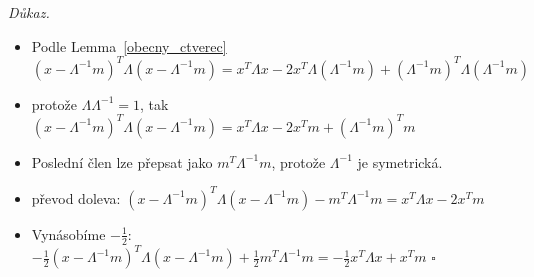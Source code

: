 \documentclass{article}
\newenvironment{pitemize}{
\begin{itemize}
  \setlength{\itemsep}{5pt}
  \setlength{\parskip}{0pt}
  \setlength{\parsep}{0pt}
}{\end{itemize}}
\newenvironment{pproof}{
\noindent\emph{Důkaz.}
\begin{pitemize}
}{\hfill$\square$\end{pitemize}}
\theoremstyle{definition}
\begin{document}
\begin{pproof}
\item Podle Lemma~\ref{obecny_ctverec} $(x-\Lambda^{-1} m)^T\Lambda(x-\Lambda^{-1} m)=x^T\Lambda x-2x^T\Lambda (\Lambda^{-1} m)+(\Lambda^{-1} m)^T\Lambda (\Lambda^{-1} m)$
\item protože $\Lambda \Lambda^{-1}=1$, tak $(x-\Lambda^{-1} m)^T\Lambda(x-\Lambda^{-1} m)=x^T\Lambda x-2x^T m+(\Lambda^{-1} m)^T m$
\item Poslední člen lze přepsat jako $m^T\Lambda^{-1}m$, protože $\Lambda^{-1}$ je symetrická.
\item převod doleva: $(x-\Lambda^{-1} m)^T\Lambda(x-\Lambda^{-1} m)-m^T\Lambda^{-1} m=x^T\Lambda x-2x^T m$
\item Vynásobíme $-\frac{1}{2}$: $-\frac{1}{2}(x-\Lambda^{-1} m)^T\Lambda(x-\Lambda^{-1} m)+\frac{1}{2}m^T\Lambda^{-1} m=-\frac{1}{2}x^T\Lambda x+x^T m$
\end{pproof}
\end{document}
